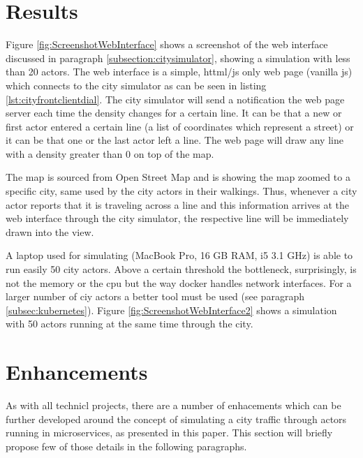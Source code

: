 \documentclass[conference]{IEEEtran}
\begin{document}
\section{Results}
\label{sec:results}

Figure \ref{fig:ScreenshotWebInterface} shows a screenshot of the web interface discussed in paragraph \ref{subsection:citysimulator}, showing a simulation with less than 20 actors. The web interface is a simple, httml/js only web page (vanilla js) which connects to the city simulator as can be seen in listing \ref{lst:cityfrontclientdial}. The city simulator will send a notification the web page server each time the density changes for a certain line. It can be that a new or first actor entered a certain line (a list of coordinates which represent a street) or it can be that one or the last actor left a line. The web page will draw any line with a density greater than 0 on top of the map.

The map is sourced from Open Street Map \citep{openstreetmap} and is showing the map zoomed to a specific city, same used by the city actors in their walkings. Thus, whenever a city actor reports that it is traveling across a line and this information arrives at the web interface through the city simulator, the respective line will be immediately drawn into the view.

A laptop used for simulating (MacBook Pro, 16 GB RAM, i5 3.1 GHz) is able to run easily 50 city actors. Above a certain threshold the bottleneck, surprisingly, is not the memory or the cpu but the way docker handles network interfaces. For a larger number of ciy actors a better tool must be used (see paragraph \ref{subsec:kubernetes}). Figure \ref{fig:ScreenshotWebInterface2} shows a simulation with 50 actors running at the same time through the city.

\section{Enhancements}
\label{sec:enhancements}

As with all technicl projects, there are a number of enhacements which can be further developed around the concept of simulating a city traffic through actors running in microservices, as presented in this paper. This section will briefly propose few of those details in the following paragraphs.
\end{document}
